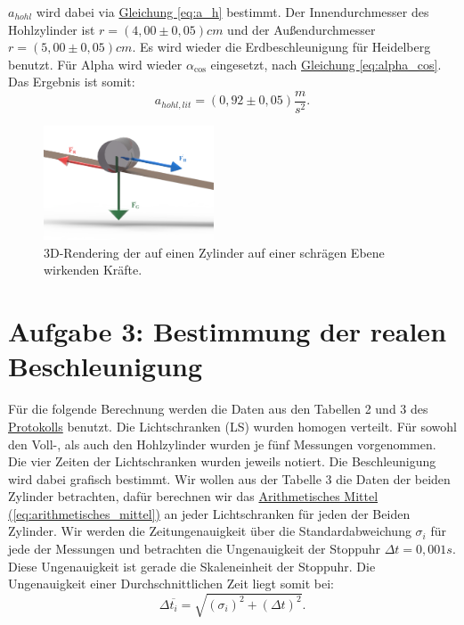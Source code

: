\newpage

$a_{hohl}$ wird dabei via \hyperref[eq:a_h]{Gleichung \ref*{eq:a_h}} bestimmt. Der Innendurchmesser des Hohlzylinder ist $r = (4,00 \pm 0,05) cm$ und der Außendurchmesser $r = (5,00 \pm 0,05) cm$. Es wird wieder die Erdbeschleunigung für Heidelberg benutzt. Für Alpha wird wieder $\alpha_{\cos}$ eingesetzt, nach \hyperref[eq:alpha_cos]{Gleichung \ref*{eq:alpha_cos}}. Das Ergebnis ist somit:
\begin{equation}
    \boxed{
        a_{hohl,lit} = (0,92 \pm 0,05) \frac{m}{s^2}
    }.
    \label{eq:a_h_l}
\end{equation}

\begin{figure}[!ht]
    \centering
    \includegraphics[width=0.45\textwidth]{img/15/Forces.pdf}
    \caption{3D-Rendering der auf einen Zylinder auf einer schrägen Ebene wirkenden Kräfte.}
    \label{fig:zylinder_forces_klein}
\end{figure}

\newpage

\section{Aufgabe 3: Bestimmung der realen Beschleunigung}
Für die folgende Berechnung werden die Daten aus den Tabellen 2 und 3 des \hyperref[Protokoll]{Protokolls} benutzt. Die Lichtschranken (LS) wurden homogen verteilt. Für sowohl den Voll-, als auch den Hohlzylinder wurden je fünf Messungen vorgenommen. Die vier Zeiten der Lichtschranken wurden jeweils notiert. Die Beschleunigung wird dabei grafisch bestimmt. 
Wir wollen aus der Tabelle 3 die Daten der beiden Zylinder betrachten, dafür berechnen wir das \hyperref[eq:arithmetisches_mittel]{Arithmetisches Mittel (\ref*{eq:arithmetisches_mittel})} an jeder Lichtschranken für jeden der Beiden Zylinder. Wir werden die Zeitungenauigkeit über die Standardabweichung $\sigma_i$ für jede der Messungen und betrachten die Ungenauigkeit der Stoppuhr $\Delta t = 0,001s$. Diese Ungenauigkeit ist gerade die Skaleneinheit der Stoppuhr. Die Ungenauigkeit einer Durchschnittlichen Zeit liegt somit bei:
\begin{equation}
    \Delta \overline{t_i} = \sqrt{(\sigma_i)^2 + (\Delta t)^2}.
\end{equation}

